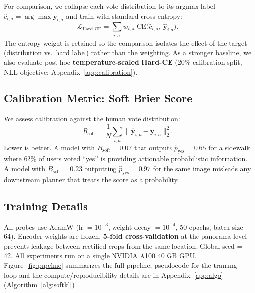 \documentclass{article}
\newcommand{\brier}{B_{\mathrm{soft}}}
\begin{document}
For comparison, we collapse each vote distribution to its argmax label $\hat{c}_{i,a} = \arg\max \mathbf{y}_{i,a}$ and train with standard cross-entropy:
\begin{equation}
\mathcal{L}_{\mathrm{Hard\text{-}CE}} = \sum_{i,a} w_{i,a}\;\mathrm{CE}\!\bigl(\hat{c}_{i,a},\,\hat{\mathbf{y}}_{i,a}\bigr).
\end{equation}
The entropy weight is retained so the comparison isolates the effect of the target (distribution vs.\ hard label) rather than the weighting. As a stronger baseline, we also evaluate post-hoc \textbf{temperature-scaled Hard-CE} (20\% calibration split, NLL objective; Appendix~\ref{app:calibration}).

\subsection{Calibration Metric: Soft Brier Score}
\label{sec:method:brier}

We assess calibration against the human vote distribution:
\begin{equation}
\brier = \frac{1}{N}\sum_{i,a} \bigl\|\hat{\mathbf{y}}_{i,a} - \mathbf{y}_{i,a}\bigr\|_2^2.
\label{eq:brier}
\end{equation}
Lower is better. A model with $\brier = 0.07$ that outputs $\hat{p}_\mathrm{yes} = 0.65$ for a sidewalk where 62\% of users voted ``yes'' is providing actionable probabilistic information. A model with $\brier = 0.23$ outputting $\hat{p}_\mathrm{yes} = 0.97$ for the same image misleads any downstream planner that treats the score as a probability.

\subsection{Training Details}
\label{sec:method:training}

All probes use AdamW (lr $= 10^{-3}$, weight decay $= 10^{-4}$, 50 epochs, batch size 64). Encoder weights are frozen. \textbf{5-fold cross-validation} at the panorama level prevents leakage between rectified crops from the same location. Global seed = 42. All experiments run on a single NVIDIA A100 40 GB GPU. Figure~\ref{fig:pipeline} summarizes the full pipeline; pseudocode for the training loop and the compute/reproducibility details are in Appendix~\ref{app:algo} (Algorithm~\ref{alg:softkl})
\end{document}

